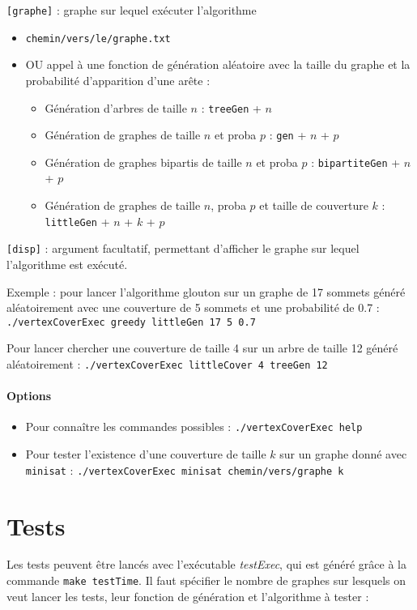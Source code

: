 \documentclass[a4paper,10pt]{article}
\newcommand*{\itemb}{\item[$\bullet$]}
\begin{document}
	\bigskip
	\texttt{[graphe]} : graphe sur lequel exécuter l'algorithme
	\begin{itemize}
		\item \texttt{chemin/vers/le/graphe.txt}
		\item OU appel à une fonction de génération aléatoire avec la taille du graphe et la probabilité d'apparition d'une arête :
			\begin{itemize}
			\itemb Génération d'arbres de taille $n$ : \texttt{treeGen} + $n$
			\itemb Génération de graphes de taille $n$ et proba $p$ : \texttt{gen} + $n$ + $p$
			\itemb Génération de graphes bipartis de taille $n$ et proba $p$ : \texttt{bipartiteGen} + $n$ + $p$
			\itemb Génération de graphes de taille $n$, proba $p$ et taille de couverture $k$ : \texttt{littleGen} + $n$ + $k$ + $p$
			\end{itemize}
	\end{itemize}
	
	\bigskip
	\texttt{[disp]} : argument facultatif, permettant d'afficher le graphe sur lequel l'algorithme est exécuté.
	
	\bigskip
	Exemple : pour lancer l'algorithme glouton sur un graphe de 17 sommets généré aléatoirement avec une couverture de 5 sommets et une probabilité de 0.7 :
	\texttt{./vertexCoverExec greedy littleGen 17 5 0.7}
	
	Pour lancer chercher une couverture de taille 4 sur un arbre de taille 12 généré aléatoirement :
	\texttt{./vertexCoverExec littleCover 4 treeGen 12}
	
	\paragraph{Options}
	\begin{itemize}
	\item Pour connaître les commandes possibles : \texttt{./vertexCoverExec help}
	\item Pour tester l'existence d'une couverture de taille $k$ sur un graphe donné avec \texttt{minisat} : \texttt{./vertexCoverExec minisat chemin/vers/graphe k}
	\end{itemize}

\section{Tests}
	Les tests peuvent être lancés avec l'exécutable \textit{testExec}, qui est généré grâce à la commande \texttt{make testTime}. Il faut spécifier le nombre de graphes sur lesquels on veut lancer les tests, leur fonction de génération et l'algorithme à tester :
	
\end{document}
